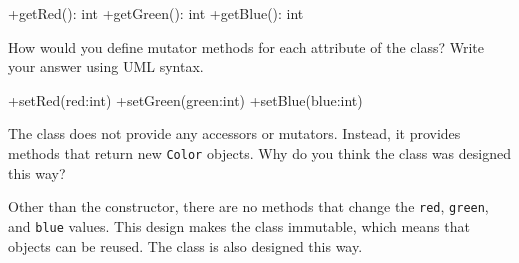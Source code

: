 \begin{answer}[5em]
\begin{javaans}
+getRed(): int
+getGreen(): int
+getBlue(): int
\end{javaans}
\end{answer}


\Q How would you define mutator methods for each attribute of the  class?
Write your answer using UML syntax.

\begin{answer}[5em]
\begin{javaans}
+setRed(red:int)
+setGreen(green:int)
+setBlue(blue:int)
\end{javaans}
\end{answer}


\Q \label{immutable}
The  class does not provide any accessors or mutators.
Instead, it provides methods that return new \texttt{Color} objects.
Why do you think the class was designed this way?

\begin{answer} [5em]
Other than the constructor, there are no methods that change the \texttt{red}, \texttt{green}, and \texttt{blue} values.
This design makes the class immutable, which means that objects can be reused.
The  class is also designed this way.
\end{answer}
